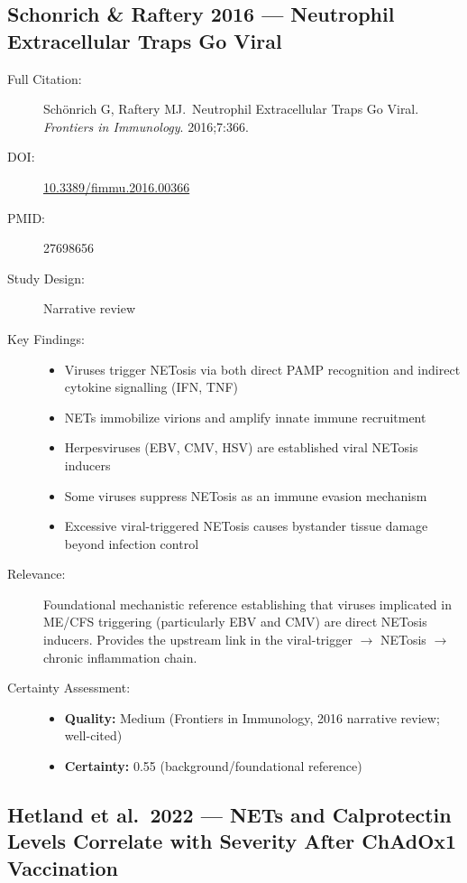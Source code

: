 \subsection{Schonrich \& Raftery 2016 --- Neutrophil Extracellular Traps Go Viral}

\begin{description}
    \item[Full Citation:] Sch\"onrich G, Raftery MJ.\ Neutrophil Extracellular Traps Go Viral. \textit{Frontiers in Immunology}. 2016;7:366. \cite{Schonrich2016}
    \item[DOI:] \href{https://doi.org/10.3389/fimmu.2016.00366}{10.3389/fimmu.2016.00366}
    \item[PMID:] 27698656
    \item[Study Design:] Narrative review
    \item[Key Findings:]
    \begin{itemize}
        \item Viruses trigger NETosis via both direct PAMP recognition and indirect cytokine signalling (IFN, TNF)
        \item NETs immobilize virions and amplify innate immune recruitment
        \item Herpesviruses (EBV, CMV, HSV) are established viral NETosis inducers
        \item Some viruses suppress NETosis as an immune evasion mechanism
        \item Excessive viral-triggered NETosis causes bystander tissue damage beyond infection control
    \end{itemize}
    \item[Relevance:] Foundational mechanistic reference establishing that viruses implicated in ME/CFS triggering (particularly EBV and CMV) are direct NETosis inducers. Provides the upstream link in the viral-trigger $\rightarrow$ NETosis $\rightarrow$ chronic inflammation chain.
    \item[Certainty Assessment:]
    \begin{itemize}
        \item \textbf{Quality:} Medium (Frontiers in Immunology, 2016 narrative review; well-cited)
        \item \textbf{Certainty:} 0.55 (background/foundational reference)
    \end{itemize}
\end{description}

\subsection{Hetland et al.\ 2022 --- NETs and Calprotectin Levels Correlate with Severity After ChAdOx1 Vaccination}


